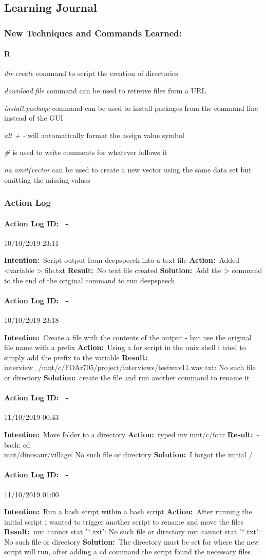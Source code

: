 \documentclass[12pt]{article}
\newcounter{problem} \setcounter{problem}{1}
\newcommand{\actionlog}[1]{\paragraph{Action Log ID: \theproblem\ -}{#1} ~\\ \addtocounter{problem}{1}}
\newcommand{\intention}[1]{\textbf{Intention:}{\textnormal\ #1} \newline}
\newcommand{\action}[1]{\textbf{Action:}{\textnormal\ #1} \newline}
\newcommand{\result}[1]{\textbf{Result:}{\textnormal\ #1} \newline}
\newcommand{\solution}[1]{\textbf{Solution:}{\textnormal\ #1} \newline}
\newcommand{\learning}[2]{\item \textit{#1} \textnormal{#2}}
\begin{document}
\subsection{Learning Journal}


\subsubsection{New Techniques and Commands Learned:}

\paragraph{R}
\learning{dir.create}{command to script the creation of directories}
\learning{download.file}{command can be used to retreive files from a URL}
\learning{install.package}{command can be used to install packages from the command line instead of the GUI}
\learning{alt + -}{will automatically format the assign value symbol}
\learning{\#}{is used to write comments for whatever follows it}
\learning{na.omit(vector}{can be used to create a new vector using the same data set but omitting the missing values}

\subsubsection{Action Log}

\actionlog{10/10/2019 23:11}
\intention{Script output from deepspeech into a text file}
\action{Added <variable > file.txt}
\result{No text file created}
\solution{Add the > command to the end of the original command to run deepspeech}

\actionlog{10/10/2019 23:18}
\intention{Create a file with the contents of the output - but use the original file name with a prefix}
\action{Using a for script in the unix shell i tried to simply add the prefix to the variable}
\result{
  interview\_/mnt/c/FOAr705/project/interviews/testwav11.wav.txt: No such file or directory}
\solution{create the file and run another command to rename it}

\actionlog{11/10/2019 00:43}
\intention{Move folder to a directory}
\action{typed mv mnt/c/foar}
\result{-bash: cd\\ mnt/dinosaur/village: No such file or directory}
\solution{I forgot the initial /}

\actionlog{11/10/2019 01:00}
\intention{Run a bash script within a bash script}
\action{After running the initial script i wanted to trigger another script to rename and move the files}
\result{mv: cannot stat '*.txt': No such file or directory
mv: cannot stat '*.txt': No such file or directory}
\solution{The directory must be set for where the new script will run, after adding a cd command the script found the necessary files}
\end{document}
